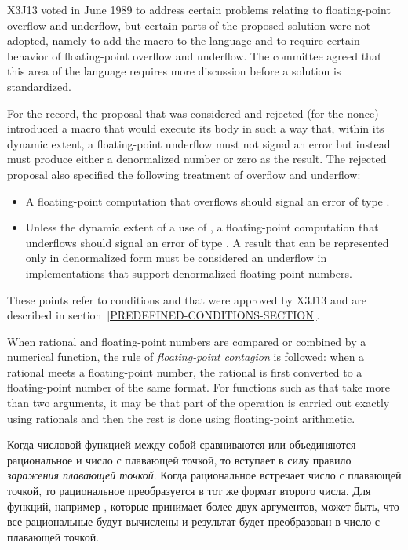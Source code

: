 \begin{newer}
X3J13 voted in June 1989 
to address certain problems relating to floating-point overflow and
underflow, but certain parts of the proposed solution were not adopted, namely
to add the macro  to the language and to
require certain behavior of floating-point overflow and underflow.
The committee agreed that this area of the language requires more
discussion before a solution is standardized.

For the record, the proposal that was considered and rejected
(for the nonce) introduced a macro
that would execute its body in such a way that, within its dynamic extent,
a floating-point underflow
must not signal an error but instead must produce
either a denormalized number or zero as the result.
The rejected proposal also specified the following treatment of overflow and underflow:
\begin{itemize}
\item A floating-point computation that overflows should signal
  an error of type .
\item Unless the dynamic extent of a use of
  , a floating-point computation that
  underflows should signal an error of type .  A
  result that can be represented only in denormalized form must be considered an
  underflow in implementations that support denormalized floating-point
  numbers.
\end{itemize}
These points refer to conditions 
and 
that were approved by X3J13
and are described in section~\ref{PREDEFINED-CONDITIONS-SECTION}.
\end{newer}


When rational and floating-point numbers are compared or combined by
a numerical function, the rule of \emph{floating-point contagion}
is followed: when a rational meets a floating-point number,
the rational is first converted to a floating-point number of
the same format.  For functions such as \cdf{+}
that take more than two arguments,
it may be that part of the operation is carried out exactly using
rationals and then the rest is done using floating-point arithmetic.

Когда числовой функцией между собой сравниваются или объединяются рациональное и
число с плавающей точкой, то вступает в силу правило \emph{заражения плавающей
  точкой}.
Когда рациональное встречает число с плавающей точкой, то рациональное
преобразуется в тот же формат второго числа.
Для функций, например \cdf{+}, которые принимает более двух аргументов, может
быть, что все рациональные будут вычислены и результат будет преобразован в
число с плавающей точкой.

